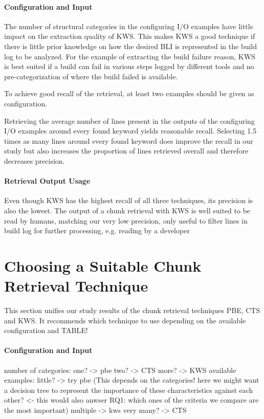 \documentclass[\myrootdir/main.tex]{subfiles}
\begin{document}
\paragraph{Configuration and Input}
The number of structural categories in the configuring I/O examples have little impact on the extraction quality of KWS.
This makes KWS a good technique if there is little prior knowledge on how the desired BLI is represented in the build log to be analyzed.
For the example of extracting the build failure reason, KWS is best suited if a build can fail in various steps logged by different tools and no pre-categorization of where the build failed is available.

To achieve good recall of the retrieval, at least two examples should be given as configuration.

Retrieving the average number of lines present in the outputs of the configuring I/O examples around every found keyword yields reasonable recall.
Selecting 1.5 times as many lines around every found keyword does improve the recall in our study but also increases the proportion of lines retrieved overall and therefore decreases precision.

\paragraph{Retrieval Output Usage}
Even though KWS has the highest recall of all three techniques, its precision is also the lowest.
The output of a chunk retrieval with KWS is well suited to be read by humans, matching our 
very low precision, only useful to filter lines in build log for further processing, e.g. reading by a developer

\section{Choosing a Suitable Chunk Retrieval Technique}
This section unifies our study results of the chunk retrieval techniques PBE, CTS and KWS.
It recommends which technique to use depending on the available configuration and 
TABLE!
\paragraph{Configuration and Input}
number of categories:
one? -> pbe
two? -> CTS
more? -> KWS
available examples:
little? -> try pbe (This depends on the categories! here we might want a decision tree to represent the importance of these characteristics against each other? <- this would also anwser RQ1: which ones of the criteria we compare are the most important)
multiple -> kws
very many? -> CTS
\end{document}
